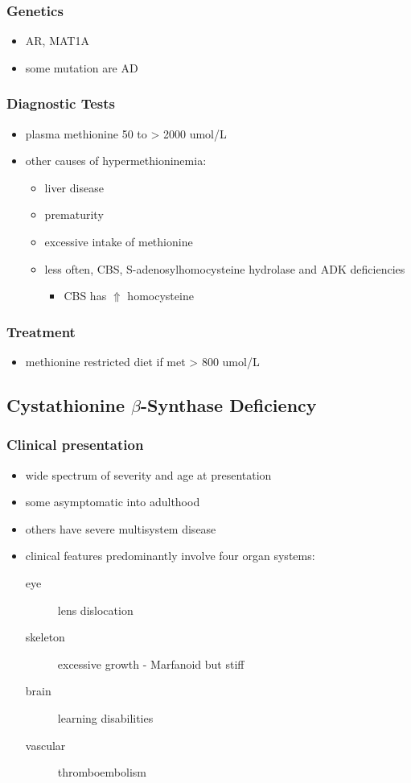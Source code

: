 \documentclass{scrartcl}
\begin{document}
\subsubsection{Genetics}
\label{sec:org81134a1}
\begin{itemize}
\item AR, MAT1A
\item some mutation are AD
\end{itemize}
\subsubsection{Diagnostic Tests}
\label{sec:org72f6157}
\begin{itemize}
\item plasma methionine 50 to \textgreater{} 2000 umol/L
\item other causes of hypermethioninemia:
\begin{itemize}
\item liver disease
\item prematurity
\item excessive intake of methionine
\item less often, CBS, S-adenosylhomocysteine hydrolase and ADK deficiencies
\begin{itemize}
\item CBS has \(\Uparrow\) homocysteine
\end{itemize}
\end{itemize}
\end{itemize}
\subsubsection{Treatment}
\label{sec:org458d98d}
\begin{itemize}
\item methionine restricted diet if met \textgreater{} 800 umol/L
\end{itemize}

\subsection{Cystathionine \(\beta\)-Synthase Deficiency}
\label{sec:orgbdd2b23}
\subsubsection{Clinical presentation}
\label{sec:org63e9712}
\begin{itemize}
\item wide spectrum of severity and age at presentation
\item some asymptomatic into adulthood
\item others have severe multisystem disease
\item clinical features predominantly involve four organ systems:
\begin{description}
\item[{eye}] lens dislocation
\item[{skeleton}] excessive growth - Marfanoid but stiff
\item[{brain}] learning disabilities
\item[{vascular}] thromboembolism
\end{description}
\end{itemize}
\end{document}
